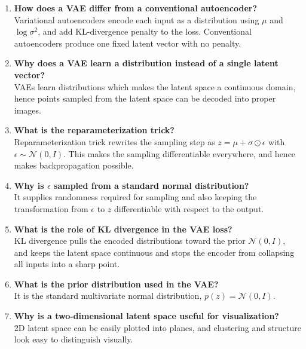 \documentclass[10pt]{article}
\begin{document}
\begin{enumerate}
\item \textbf{How does a VAE differ from a conventional autoencoder?}\\
Variational autoencoders encode each input as a distribution using  $\mu$ and $\log\sigma^2$, and add KL-divergence penalty to the loss. Conventional autoencoders produce one fixed latent vector with no penalty.\\

\item \textbf{Why does a VAE learn a distribution instead of a single latent vector?}\\
VAEs learn distributions which makes the latent space a continuous domain, hence points sampled from the latent space can be decoded into proper images.\\

\item \textbf{What is the reparameterization trick?}\\
Reparameterization trick rewrites the sampling step as $z = \mu + \sigma \odot \epsilon$ with $\epsilon \sim \mathcal{N}(0,I)$. This makes the sampling differentiable everywhere, and hence makes backpropagation possible.\\

\item \textbf{Why is $\epsilon$ sampled from a standard normal distribution?}\\
It supplies randomness required for sampling and also keeping the transformation from $\epsilon$ to $z$ differentiable with respect to the output.\\

\item \textbf{What is the role of KL divergence in the VAE loss?}\\
KL divergence pulls the encoded distributions toward the prior $\mathcal{N}(0,I)$, and keeps the latent space continuous and stops the encoder from collapsing all inputs into a sharp point.\\

\item \textbf{What is the prior distribution used in the VAE?}\\
It is the standard multivariate normal distribution, $p(z) = \mathcal{N}(0, I)$.\\

\item \textbf{Why is a two-dimensional latent space useful for visualization?}\\
2D latent space can be easily plotted into planes, and clustering and structure look easy to distinguish visually.\\


\end{enumerate}
\end{document}
